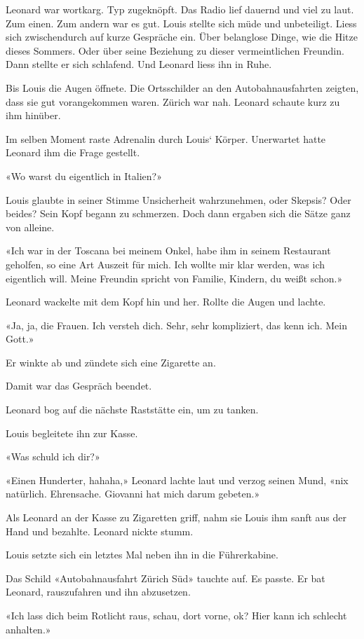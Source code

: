 Leonard war wortkarg. Typ zugeknöpft. Das Radio lief dauernd und viel zu
laut. Zum einen. Zum andern war es gut. Louis stellte sich müde und
unbeteiligt. Liess sich zwischendurch auf kurze Gespräche ein. Über
belanglose Dinge, wie die Hitze dieses Sommers. Oder über seine
Beziehung zu dieser vermeintlichen Freundin. Dann stellte er sich
schlafend. Und Leonard liess ihn in Ruhe.

Bis Louis die Augen öffnete. Die Ortsschilder an den Autobahnausfahrten
zeigten, dass sie gut vorangekommen waren. Zürich war nah. Leonard
schaute kurz zu ihm hinüber.

Im selben Moment raste Adrenalin durch Louis` Körper. Unerwartet hatte
Leonard ihm die Frage gestellt.

«Wo warst du eigentlich in Italien?»

Louis glaubte in seiner Stimme Unsicherheit wahrzunehmen, oder Skepsis?
Oder beides? Sein Kopf begann zu schmerzen. Doch dann ergaben sich die
Sätze ganz von alleine.

«Ich war in der Toscana bei meinem Onkel, habe ihm in seinem Restaurant
geholfen, so eine Art Auszeit für mich. Ich wollte mir klar werden, was
ich eigentlich will. Meine Freundin spricht von Familie, Kindern, du
weißt schon.»

Leonard wackelte mit dem Kopf hin und her. Rollte die Augen und lachte.

«Ja, ja, die Frauen. Ich versteh dich. Sehr, sehr kompliziert, das kenn
ich. Mein Gott.»

Er winkte ab und zündete sich eine Zigarette an.

Damit war das Gespräch beendet.

Leonard bog auf die nächste Raststätte ein, um zu tanken.

Louis begleitete ihn zur Kasse.

«Was schuld ich dir?»

«Einen Hunderter, hahaha,» Leonard lachte laut und verzog seinen Mund,
«nix natürlich. Ehrensache. Giovanni hat mich darum gebeten.»

Als Leonard an der Kasse zu Zigaretten griff, nahm sie Louis ihm sanft
aus der Hand und bezahlte. Leonard nickte stumm.

Louis setzte sich ein letztes Mal neben ihn in die Führerkabine.

Das Schild «Autobahnausfahrt Zürich Süd» tauchte auf. Es passte. Er bat
Leonard, rauszufahren und ihn abzusetzen.

«Ich lass dich beim Rotlicht raus, schau, dort vorne, ok? Hier kann ich
schlecht anhalten.»


